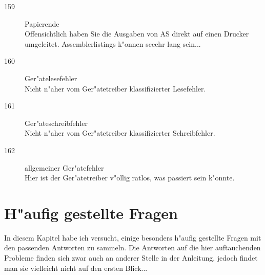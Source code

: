 \documentclass[12pt,a4paper,twoside]{report}
\begin{document}
\begin{description}
\item[159]{Papierende\\
           Offensichtlich haben Sie die Ausgaben von AS direkt auf einen
           Drucker umgeleitet.  Assemblerlistings k"onnen seeehr lang
           sein...}

\item[160]{Ger"atelesefehler\\
           Nicht n"aher vom Ger"atetreiber klassifizierter Lesefehler.}

\item[161]{Ger"ateschreibfehler\\
           Nicht n"aher vom Ger"atetreiber klassifizierter Schreibfehler.}

\item[162]{allgemeiner Ger"atefehler\\
           Hier ist der Ger"atetreiber v"ollig ratlos, was passiert
           sein k"onnte.}
\end{description}


\cleardoublepage
\chapter{H"aufig gestellte Fragen}

In diesem Kapitel habe ich versucht, einige besonders h"aufig gestellte
Fragen mit den passenden Antworten zu sammeln.  Die Antworten auf
die hier auftauchenden Probleme finden sich zwar auch an anderer
Stelle in der Anleitung, jedoch findet man sie vielleicht nicht auf
den ersten Blick...
\end{document}
